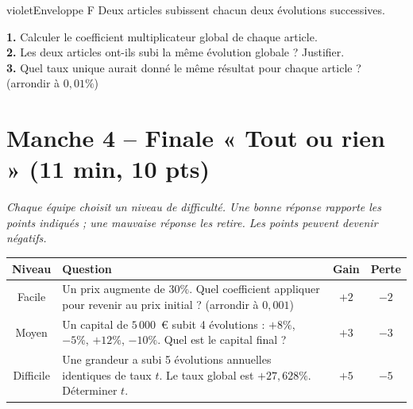 \documentclass[12pt,a4paper]{article}
\begin{document}
\newpage

\begin{carte}{violet}{Enveloppe F}
Deux articles subissent chacun deux évolutions successives.\\[0.2cm]
\textbf{1.} Calculer le coefficient multiplicateur global de chaque article.\\[0.1cm]
\textbf{2.} Les deux articles ont-ils subi la même évolution globale ? Justifier.\\[0.1cm]
\textbf{3.} Quel taux unique aurait donné le même résultat pour chaque article ? (arrondir à \(0{,}01\%\))
\end{carte}

\newpage

\section*{Manche 4 -- Finale « Tout ou rien » (11 min, 10 pts)}

\textit{Chaque équipe choisit un niveau de difficulté. Une bonne réponse rapporte les points indiqués ; une mauvaise réponse les retire. Les points peuvent devenir négatifs.}

\vspace{0.3cm}

\begin{center}
\renewcommand{\arraystretch}{1.5}
\begin{tabular}{|c|p{8.5cm}|c|c|}
\hline
\textbf{Niveau} & \textbf{Question} & \textbf{Gain} & \textbf{Perte} \\
\hline
Facile & Un prix augmente de \(30\%\). Quel coefficient appliquer pour revenir au prix initial ? (arrondir à \(0{,}001\)) & \(+2\) & \(-2\) \\
\hline
Moyen & Un capital de \(5\,000\)~\euro{} subit 4 évolutions : \(+8\%\), \(-5\%\), \(+12\%\), \(-10\%\). Quel est le capital final ? & \(+3\) & \(-3\) \\
\hline
Difficile & Une grandeur a subi 5 évolutions annuelles identiques de taux \(t\). Le taux global est \(+27{,}628\%\). Déterminer \(t\). & \(+5\) & \(-5\) \\
\hline
\end{tabular}
\end{center}
\end{document}
